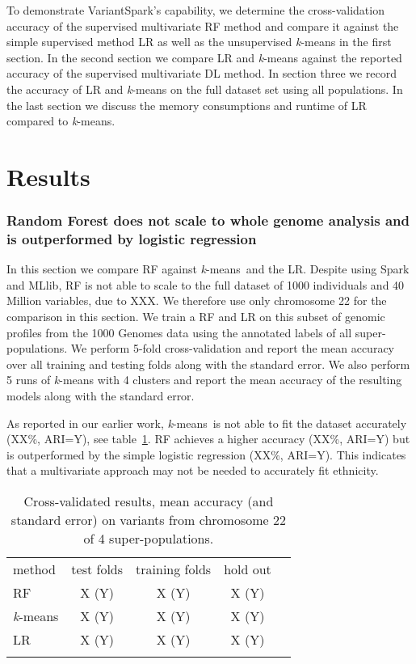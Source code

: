 \documentclass{llncs}
\newcommand{\variantSpark}{{\sc VariantSpark}}
\newcommand{\kMeans}{\textit{k}-means}
\begin{document}
{To demonstrate \variantSpark's capability, we determine the cross-validation accuracy of the supervised multivariate RF method and compare it against the simple supervised method LR as well as the unsupervised \kMeans{} in the first section.
In the second section we compare LR and \kMeans{} against the reported accuracy of the supervised multivariate DL method.
In section three we record the accuracy of LR and \kMeans{} on the full dataset set using all populations. 
In the last section we discuss the memory consumptions and runtime of LR compared to \kMeans{}.


\section{Results}

\subsubsection{Random Forest does not scale to whole genome analysis and is outperformed by logistic regression}
In this section we compare RF against \kMeans\ and the LR.
Despite using {\sc Spark} and {\sc MLlib}, RF is not able to scale to the full dataset of 1000 individuals and 40 Million variables, due to XXX. 
We therefore use only chromosome 22 for the comparison in this section.
We train a RF and LR on this subset of genomic profiles from the 1000 Genomes data using the annotated labels of all super-populations.
We perform 5-fold cross-validation and report the mean accuracy over all training and testing folds along with the standard error.
We also perform 5 runs of \kMeans{} with 4 clusters and report the mean accuracy of the resulting models along with the standard error. 

As reported in our earlier work, \kMeans\ is not able to fit the dataset accurately (XX\%, ARI=Y), see table~\ref{RF}.
RF achieves a higher accuracy (XX\%, ARI=Y) but is outperformed by the simple logistic regression (XX\%, ARI=Y).
This indicates that a multivariate approach may not be needed to accurately fit ethnicity. 


\begin{table}
\caption{Cross-validated results, mean accuracy (and standard error) on variants from chromosome 22 of 4 super-populations.}
\begin{center}
\renewcommand{\arraystretch}{1.4}
\setlength\tabcolsep{3pt}
\begin{tabular}{lcccc}
\hline\noalign{\smallskip}
method  & test folds & training folds & hold out \\
RF  & X (Y) & X (Y) & X (Y) \\
\kMeans & X (Y) & X (Y) & X (Y) \\
LR & X (Y) & X (Y) & X (Y) \\
\noalign{\smallskip}
\hline
\label{RF}
\end{tabular}
\end{center}
\end{table}




}
\end{document}
